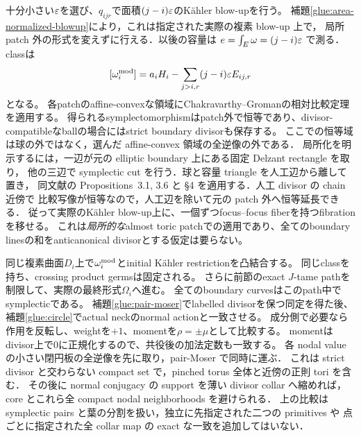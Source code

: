 十分小さい$\varepsilon$を選び、$q_{ijr}$で面積$(j-i)\varepsilon$のKähler blow-upを行う。
補題\ref{glue:area-normalized-blowup}により，これは指定された実際の複素 blow-up 上で，
局所 patch 外の形式を変えずに行える．以後の容量は $e=\int_E\omega=(j-i)\varepsilon$ で測る．
classは
\[
[\omega_i^{\rm mod}]=a_iH_i-\sum_{j>i,r}(j-i)\varepsilon E_{ij,r}
\]
となる。
各patchのaffine-convexな領域にChakravarthy--Gromanの相対比較定理を適用する\cite[Theorem 1.1]{CGblowup}。
得られるsymplectomorphismはpatch外で恒等であり、divisor-compatibleなballの場合にはstrict boundary divisorも保存する。
ここでの恒等域は球の外ではなく，選んだ affine-convex 領域の全逆像の外である．
局所化を明示するには，一辺が元の elliptic boundary 上にある固定 Delzant rectangle を取り，
他の三辺で symplectic cut を行う．球と容量 triangle を人工辺から離して置き，
同文献の Propositions~3.1, 3.6 と \S4 を適用する．人工 divisor の chain 近傍で
比較写像が恒等なので，人工辺を除いて元の patch 外へ恒等延長できる．
従って実際のKähler blow-up上に、一個ずつfocus--focus fiberを持つfibrationを移せる。
これは\emph{局所的な}almost toric patchでの適用であり、全てのboundary linesの和をanticanonical divisorとする仮定は要らない。

同じ複素曲面$D_i$上で$\omega_i^{\rm mod}$とinitial Kähler restrictionを凸結合する。
同じclassを持ち、crossing product germsは固定される。
さらに前節のexact $J$-tame pathを制限して、実際の最終形式$\Omega_i$へ進む。
全てのboundary curvesはこのpath中でsymplecticである。
補題\ref{glue:pair-moser}でlabelled divisorを保つ同定を得た後、補題\ref{glue:circle}でactual neckのnormal actionと一致させる。
成分側で必要なら作用を反転し、weightを$+1$、momentを$\rho=\pm\mu$として比較する。
momentはdivisor上で0に正規化するので、共役後の加法定数も一致する。
各 nodal value の小さい閉円板の全逆像を先に取り，pair-Moser で同時に運ぶ．
これは strict divisor と交わらない compact set で，pinched torus 全体と近傍の正則 tori を含む．
その後に normal conjugacy の support を薄い divisor collar へ縮めれば，
core とこれら全 compact nodal neighborhoods を避けられる．
上の比較は symplectic pairs と葉の分割を扱い，独立に先指定された二つの primitives や
点ごとに指定された全 collar map の exact な一致を追加してはいない．


